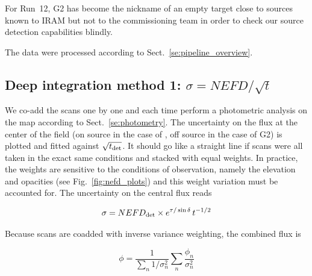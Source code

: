 For Run~12, G2 has become the nickname of an empty target close to sources known
to IRAM but not to the commissioning team in order to check our source
detection capabilities blindly.

The data were processed according to Sect.~\ref{se:pipeline_overview}.

\subsection{Deep integration method 1: $\sigma = NEFD/\sqrt{t}$}
\label{se:nefd_m1}


We co-add the scans one by one and each time perform a photometric analysis on
the map according to Sect.~\ref{se:photometry}. The uncertainty on the flux at
the center of the field (on source in the case of \hls, off source in the case
of G2) is plotted and fitted against $\sqrt{t_{\rm{det}}}$. It should go like a
straight line if scans were all taken in the exact same conditions and stacked
with equal weights. In practice, the weights are sensitive to the conditions of
observation, namely the elevation and opacities (see Fig.~\ref{fig:nefd_plots})
and this weight variation must be accounted for. The uncertainty on
the central flux reads

\begin{equation}
\sigma = NEFD_{\rm{det}}\times e^{\tau/\sin\delta}\,t^{-1/2}
\label{eq:sigma_nefd}
\end{equation}

Because scans are coadded with inverse variance weighting, the combined flux is

\begin{equation}
\phi = \frac{1}{\sum_n 1/\sigma_n^2}\sum_n\frac{\phi_n}{\sigma_n^2}
\end{equation}

